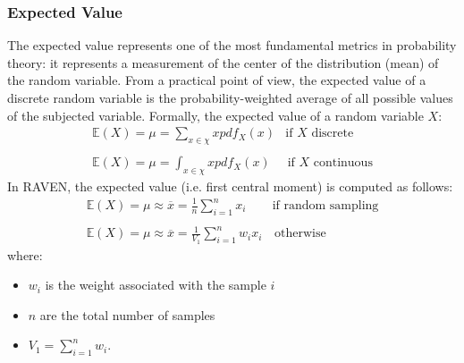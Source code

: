 \subsubsection{Expected Value}
The expected value represents one of the most fundamental metrics in probability theory: it represents a measurement of the center of the distribution (mean) of the random variable. 
From a practical point of view, the expected value of a discrete random variable is the probability-weighted average of all possible values of the subjected variable. Formally, the expected value of a random variable $X$:
\begin{equation}
\begin{matrix}
\mathbb{E}(X) = \mu = \sum_{x \in \chi} x  pdf_{X}(x) & \text{if  $X$  discrete} \\ 
\\ 
\mathbb{E}(X) = \mu = \int_{x \in \chi} x pdf_{X}(x) & \, \text{if $X$ continuous}
\end{matrix}
\end{equation}
In RAVEN, the expected value (i.e. first central moment) is computed as follows:
\begin{equation}
\begin{matrix}
\mathbb{E}(X) = \mu \approx \overline{x} = \frac{1}{n} \sum_{i=1}^{n}  x_{i} & \text{if  random sampling} \\ 
\\ 
\mathbb{E}(X) = \mu \approx \overline{x} = \frac{1}{V_{1}} \sum_{i=1}^{n} w_{i}  x_{i}  & \, \text{otherwise}
\end{matrix}
\end{equation}
where:
\begin{itemize}
  \item $w_{i}$ is the weight associated with the sample $i$
  \item $n$ are the total number of samples
  \item $V_{1} = \sum_{i=1}^{n} w_{i}$.
\end{itemize}
